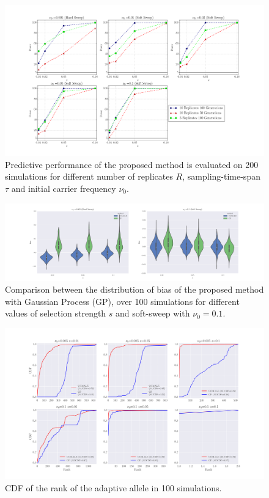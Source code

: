 \documentclass[11pt]{article}
\begin{document}
\begin{figure}[H]
	\centering
	\includegraphics[trim=2.2in 0 2.2in 0, 
	clip,width=\textwidth]{powerReplicateTime}
	\caption{Predictive performance of the proposed method is evaluated on 200 
		simulations for different number of replicates $R$, 
		sampling-time-span $\tau$ and initial carrier 
		frequency $\nu_0$.} \label{fig:powerrt}
\end{figure}
\begin{figure}[H]
	\centering
	\includegraphics[trim=2.2in 0 2.2in 0, 
	clip,width=\textwidth]{bias}
	\caption{Comparison between the distribution of bias of the proposed method 
		with Gaussian Process (GP), over 100 simulations for different values 
		of 
		selection strength $s$ and soft-sweep with $\nu_0=0.1$.} 
		\label{fig:bias}
\end{figure}



\begin{figure}[H]
	\centering
	\includegraphics[trim=.2in 0 .2in 0, 
	clip,width=\textwidth]{rank}
	\caption{CDF of the rank of the adaptive allele in 100 simulations.} 
	\label{fig:rank}
\end{figure}
\end{document}
